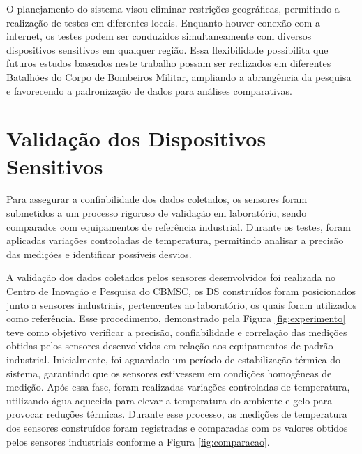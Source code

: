 
\tab O planejamento do sistema visou eliminar restrições geográficas, permitindo a realização de testes em diferentes locais. Enquanto houver conexão com a internet, os testes podem ser conduzidos simultaneamente com diversos dispositivos sensitivos em qualquer região. Essa flexibilidade possibilita que futuros estudos baseados neste trabalho possam ser realizados em diferentes Batalhões do Corpo de Bombeiros Militar, ampliando a abrangência da pesquisa e favorecendo a padronização de dados para análises comparativas.

	
	
\section{Validação dos Dispositivos Sensitivos}
    Para assegurar a confiabilidade dos dados coletados, os sensores foram submetidos a um processo rigoroso de validação em laboratório, sendo comparados com equipamentos de referência industrial. Durante os testes, foram aplicadas variações controladas de temperatura, permitindo analisar a precisão das medições e identificar possíveis desvios.

	A validação dos dados coletados pelos sensores desenvolvidos foi realizada no Centro de Inovação e Pesquisa do \acrshort{CBMSC}, os \acrlong{DS}
	 construídos foram posicionados junto a sensores industriais, pertencentes ao laboratório, os quais foram utilizados como referência. Esse procedimento, demonstrado pela Figura \ref{fig:experimento} teve como objetivo verificar a precisão, confiabilidade e correlação das medições obtidas pelos sensores desenvolvidos em relação aos equipamentos de padrão industrial.
	\tab Inicialmente, foi aguardado um período de estabilização térmica do sistema, garantindo que os sensores estivessem em condições homogêneas de medição. Após essa fase, foram realizadas variações controladas de temperatura, utilizando água aquecida para elevar a temperatura do ambiente e gelo para provocar reduções térmicas. Durante esse processo, as medições de temperatura dos sensores construídos foram registradas e comparadas com os valores obtidos pelos sensores industriais conforme a Figura \ref{fig:comparacao}.
	
    

